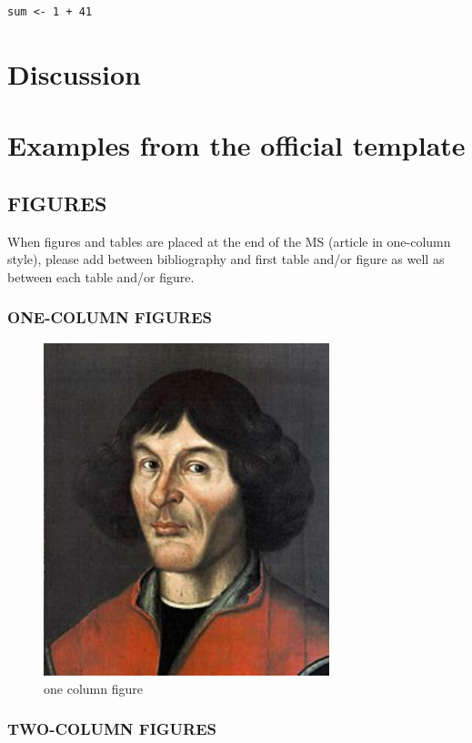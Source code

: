 \documentclass[gc, manuscript]{copernicus}
\begin{document}
\begin{verbatim}
sum <- 1 + 41
\end{verbatim}

\section{Discussion}

\section{Examples from the official template}

\subsection{FIGURES}

When figures and tables are placed at the end of the MS (article in
one-column style), please add \clearpage between bibliography and first
table and/or figure as well as between each table and/or figure.

\subsubsection{ONE-COLUMN FIGURES}

\begin{figure}
\includegraphics[width=8.3cm]{Nikolaus_Kopernikus} \caption{one column figure}\label{fig:unnamed-chunk-5}
\end{figure}

\subsubsection{TWO-COLUMN FIGURES}
\end{document}
